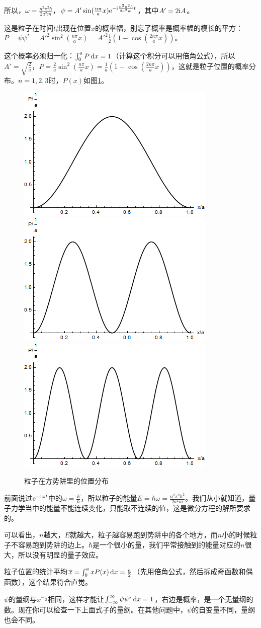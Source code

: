 所以，$\omega=\frac{n^2 \pi^2 \hbar}{2 a^2 m}$，$\psi=A' \sin(\frac{n \pi}{a} x) \mathrm{e}^{-\mathrm{i} \frac{n^2 \pi^2 \hbar}{2 a^2 m} t}$，其中$A'=2 \mathrm{i} A$。

这是粒子在时间$t$出现在位置$x$的概率幅，别忘了概率是概率幅的模长的平方：$P=\psi \psi^*=A'^2 \sin^2 (\frac{n \pi}{a} x)=A'^2 \frac{1}{2} (1-\cos(\frac{2 n \pi}{a} x))$。

这个概率必须归一化：$\int_0^a P \mathop{}\!\mathrm{d} x=1$（计算这个积分可以用倍角公式），所以$A'=\sqrt{\frac{2}{a}}$，$P=\frac{2}{a} \sin^2 (\frac{n \pi}{a} x)=\frac{1}{a} (1-\cos(\frac{2 n \pi}{a} x))$，这就是粒子位置的概率分布。$n=1,2,3$时，$P(x)$如图\ref{fig-square-well}。
\begin{figure}[htb]
\centering
\includegraphics[width=0.27\linewidth]{fig/square-well.png}
\includegraphics[width=0.27\linewidth]{fig/square-well-2.png}
\includegraphics[width=0.27\linewidth]{fig/square-well-3.png}
\caption{粒子在方势阱里的位置分布}
\label{fig-square-well}
\end{figure}

前面说过$\mathrm{e}^{-\mathrm{i} \omega t}$中的$\omega=\frac{E}{\hbar}$，所以粒子的能量$E=\hbar \omega=\frac{n^2 \pi^2 \hbar^2}{2 a^2 m}$。我们从小就知道，量子力学当中的能量不能连续变化，只能取不连续的值，这是微分方程的解所要求的。

可以看出，$n$越大，$E$就越大，粒子越容易跑到势阱中的各个地方，而$n$小的时候粒子不容易跑到势阱的边上。$\hbar$是一个很小的量，我们平常接触到的能量对应的$n$很大，所以没有明显的量子效应。

粒子位置的统计平均$\overline{x}=\int_0^a x P(x) \mathop{}\!\mathrm{d} x=\frac{a}{2}$（先用倍角公式，然后拆成奇函数和偶函数），这个结果符合直觉。

$\psi$的量纲与$x^{-\frac{1}{2}}$相同，这样才能让$\int_{-\infty}^{\infty} \psi \psi^* \mathop{}\!\mathrm{d} x=1$，右边是概率，是一个无量纲的数。现在你可以检查一下上面式子的量纲。在其他问题中，$\psi$的自变量不同，量纲也会不同。
